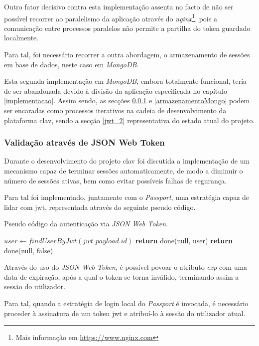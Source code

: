 Outro fator decisivo contra esta implementação assenta no facto de não ser possível recorrer ao paralelismo da aplicação através do \emph{nginx}\footnote{Mais informação em \url{https://www.nginx.com}}, pois a comunicação entre processos paralelos não permite a partilha do token guardado localmente.

Para tal, foi necessário recorrer a outra abordagem, o armazenamento de sessões em base de dados, neste caso em \emph{MongoDB}.

Esta segunda implementação em \emph{MongoDB}, embora totalmente funcional, teria de ser abandonada devido à divisão da aplicação especificada no capítulo \ref{implementacao}. Assim sendo, as secções \ref{jwt_1} e \ref{armazenamentoMongo} podem ser encaradas como processos iterativos na cadeia de desenvolvimento da plataforma \gls{clav}, sendo a secção \ref{jwt_2} representativa do estado atual do projeto.

\subsubsection{Validação através de JSON Web Token} \label{jwt_1}

Durante o desenvolvimento do projeto \gls{clav} foi discutida a implementação de um mecanismo capaz de terminar sessões automaticamente, de modo a diminuir o número de sessões ativas, bem como evitar possíveis falhas de segurança.

Para tal foi implementado, juntamente com o \emph{Passport}, uma estratégia capaz de lidar com \gls{jwt}, representada através do seguinte pseudo código.

\begin{algorithm}
    \caption{Pseudo código da autenticação via \emph{JSON Web Token}.}
    \begin{algorithmic}[1]
        \State $user \gets findUserByJwt(jwt\_payload.id)$
            \State \textbf{return} done(null, user)
        \Else
            \State \textbf{return} done(null, false)
        \EndIf
    \EndFunction
    \end{algorithmic}
\end{algorithm}

Através do uso do \emph{JSON Web Token}, é possível povoar o atributo \emph{exp} com uma data de expiração, após a qual o token se torna inválido, terminando assim a sessão do utilizador.

Para tal, quando a estratégia de login local do \emph{Passport} é invocada, é necessário proceder à assinatura de um token \gls{jwt} e atribuí-lo à sessão do utilizador atual.

